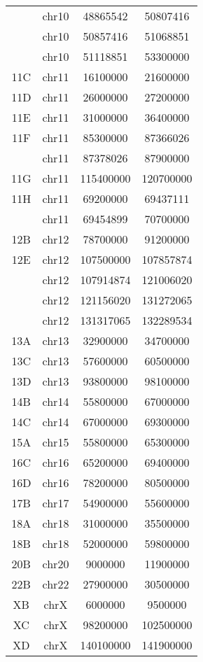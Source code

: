 \begin{center}
\begin{longtable}{@{\extracolsep{\fill}}cccc}
         & chr10      & 48865542  & 50807416 \\
         & chr10      & 50857416  & 51068851 \\
         & chr10      & 51118851  & 53300000 \\
  11C    & chr11      & 16100000  & 21600000 \\
  11D    & chr11      & 26000000  & 27200000 \\
  11E    & chr11      & 31000000  & 36400000 \\
  11F    & chr11      & 85300000  & 87366026 \\
         & chr11      & 87378026  & 87900000 \\
  11G    & chr11      & 115400000 & 120700000 \\
  11H    & chr11      & 69200000  & 69437111 \\
         & chr11      & 69454899  & 70700000 \\
  12B    & chr12      & 78700000  & 91200000 \\
  12E    & chr12      & 107500000 & 107857874 \\
         & chr12      & 107914874 & 121006020 \\
         & chr12      & 121156020 & 131272065 \\
         & chr12      & 131317065 & 132289534 \\
  13A    & chr13      & 32900000  & 34700000 \\
  13C    & chr13      & 57600000  & 60500000 \\
  13D    & chr13      & 93800000  & 98100000 \\
  14B    & chr14      & 55800000  & 67000000 \\
  14C    & chr14      & 67000000  & 69300000 \\
  15A    & chr15      & 55800000  & 65300000 \\
  16C    & chr16      & 65200000  & 69400000 \\
  16D    & chr16      & 78200000  & 80500000 \\
  17B    & chr17      & 54900000  & 55600000 \\
  18A    & chr18      & 31000000  & 35500000 \\
  18B    & chr18      & 52000000  & 59800000 \\
  20B    & chr20      & 9000000   & 11900000 \\
  22B    & chr22      & 27900000  & 30500000 \\
  XB     & chrX       & 6000000   & 9500000 \\
  XC     & chrX       & 98200000  & 102500000 \\
  XD     & chrX       & 140100000 & 141900000 
\end{longtable}
\end{center}
